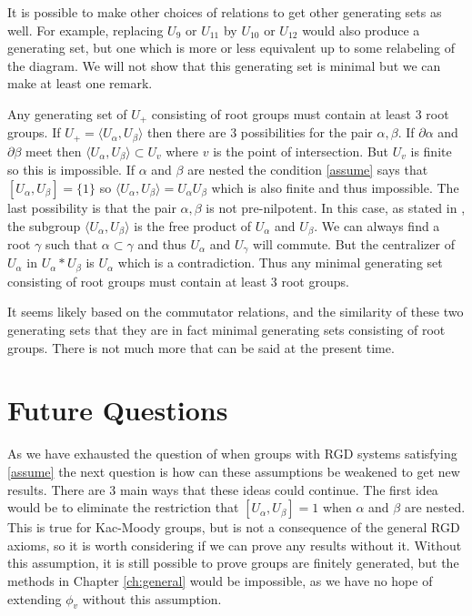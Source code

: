 \documentclass[class=book, crop=false]{standalone}
\begin{document}
It is possible to make other choices of relations to get other generating sets as well. For example, replacing $U_9$ or $U_{11}$ by $U_{10}$ or $U_{12}$ would also produce a generating set, but one which is more or less equivalent up to some relabeling of the diagram. We will not show that this generating set is minimal but we can make at least one remark.

Any generating set of $U_+$ consisting of root groups must contain at least 3 root groups. If $U_+=\langle U_\alpha,U_\beta\rangle$ then there are 3 possibilities for the pair $\alpha,\beta.$ If $\partial\alpha$ and $\partial\beta$ meet then $\langle U_\alpha,U_\beta\rangle\subset U_v$ where $v$ is the point of intersection. But $U_v$ is finite so this is impossible. If $\alpha$ and $\beta$ are nested the condition \eqref{assume} says that $[U_\alpha,U_\beta]=\{1\}$ so $\langle U_\alpha,U_\beta\rangle=U_\alpha U_\beta$ which is also finite and thus impossible. The last possibility is that the pair $\alpha,\beta$ is not pre-nilpotent. In this case, as stated in \cite{free}, the subgroup $\langle U_\alpha,U_\beta\rangle$ is the free product of $U_\alpha$ and $U_\beta.$ We can always find a root $\gamma$ such that $\alpha\subset \gamma$ and thus $U_\alpha$ and $U_\gamma$ will commute. But the centralizer of $U_\alpha$ in $U_\alpha\ast U_\beta$ is $U_\alpha$ which is a contradiction. Thus any minimal generating set consisting of root groups must contain at least 3 root groups. 

It seems likely based on the commutator relations, and the similarity of these two generating sets that they are in fact minimal generating sets consisting of root groups. There is not much more that can be said at the present time.

\section{Future Questions}
As we have exhausted the question of when groups with RGD systems satisfying \eqref{assume} the next question is how can these assumptions be weakened to get new results. There are 3 main ways that these ideas could continue. The first idea would be to eliminate the restriction that $[U_\alpha,U_\beta]=1$ when $\alpha$ and $\beta$ are nested. This is true for Kac-Moody groups, but is not a consequence of the general RGD axioms, so it is worth considering if we can prove any results without it. Without this assumption, it is still possible to prove groups are finitely generated, but the methods in Chapter \ref{ch:general} would be impossible, as we have no hope of extending $\phi_v$ without this assumption.
\end{document}
